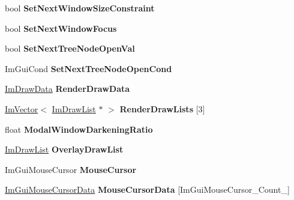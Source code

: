 \begin{DoxyCompactItemize}
\item 
\mbox{\label{struct_im_gui_context_a9d2204e10eb23d9ab8aa653b555fb851}} 
bool {\bfseries Set\+Next\+Window\+Size\+Constraint}
\item 
\mbox{\label{struct_im_gui_context_a11a744f855421fedef4adff0cac48bcb}} 
bool {\bfseries Set\+Next\+Window\+Focus}
\item 
\mbox{\label{struct_im_gui_context_aab81a8f92b73046a0277f77fad4dcc85}} 
bool {\bfseries Set\+Next\+Tree\+Node\+Open\+Val}
\item 
\mbox{\label{struct_im_gui_context_a2b78c616a3d9d26cfe28c575fe6506dc}} 
Im\+Gui\+Cond {\bfseries Set\+Next\+Tree\+Node\+Open\+Cond}
\item 
\mbox{\label{struct_im_gui_context_a81cacf53454e6dc932a7e3181179a3af}} 
\hyperlink{struct_im_draw_data}{Im\+Draw\+Data} {\bfseries Render\+Draw\+Data}
\item 
\mbox{\label{struct_im_gui_context_a65c7d5bafc5cb52d77d181925ff777da}} 
\hyperlink{class_im_vector}{Im\+Vector}$<$ \hyperlink{struct_im_draw_list}{Im\+Draw\+List} $\ast$ $>$ {\bfseries Render\+Draw\+Lists} \mbox{[}3\mbox{]}
\item 
\mbox{\label{struct_im_gui_context_ac4088a7de19357cdfeb3ead2d53ffcd8}} 
float {\bfseries Modal\+Window\+Darkening\+Ratio}
\item 
\mbox{\label{struct_im_gui_context_abc8e0592d9beea307d78661df0a38b1a}} 
\hyperlink{struct_im_draw_list}{Im\+Draw\+List} {\bfseries Overlay\+Draw\+List}
\item 
\mbox{\label{struct_im_gui_context_ab60730c7f9f601fd0b22dac060a822e3}} 
Im\+Gui\+Mouse\+Cursor {\bfseries Mouse\+Cursor}
\item 
\mbox{\label{struct_im_gui_context_a244c1b68fdb7da04de90d5becd5a5777}} 
\hyperlink{struct_im_gui_mouse_cursor_data}{Im\+Gui\+Mouse\+Cursor\+Data} {\bfseries Mouse\+Cursor\+Data} \mbox{[}Im\+Gui\+Mouse\+Cursor\+\_\+\+Count\+\_\+\mbox{]}

\end{DoxyCompactItemize}
